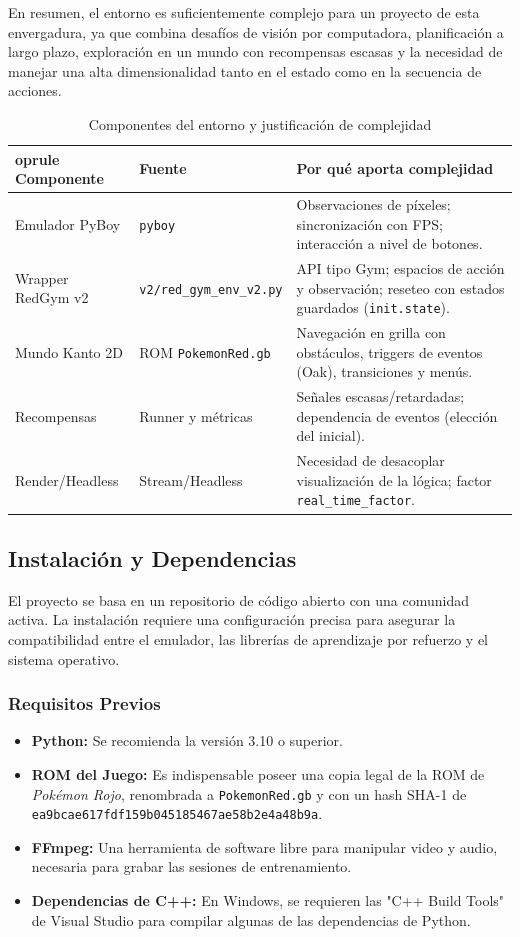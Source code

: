 \documentclass[12pt, oneside, openany]{book}
\begin{document}
En resumen, el entorno es suficientemente complejo para un proyecto de esta envergadura, ya que combina desafíos de visión por computadora, planificación a largo plazo, exploración en un mundo con recompensas escasas y la necesidad de manejar una alta dimensionalidad tanto en el estado como en la secuencia de acciones.

\begin{table}[H]
    \centering
    \caption{Componentes del entorno y justificación de complejidad}
    \label{tab:entorno_componentes}
    \begin{tabular}{@{}llp{7.5cm}@{}}
        	oprule
        Componente & Fuente & Por qué aporta complejidad \\
        \midrule
        Emulador PyBoy & \texttt{pyboy} & Observaciones de píxeles; sincronización con FPS; interacción a nivel de botones. \\
        Wrapper RedGym v2 & \texttt{v2/red\_gym\_env\_v2.py} & API tipo Gym; espacios de acción y observación; reseteo con estados guardados (\texttt{init.state}). \\
        Mundo Kanto 2D & ROM \texttt{PokemonRed.gb} & Navegación en grilla con obstáculos, triggers de eventos (Oak), transiciones y menús. \\
        Recompensas & Runner y métricas & Señales escasas/retardadas; dependencia de eventos (elección del inicial). \\
        Render/Headless & Stream/Headless & Necesidad de desacoplar visualización de la lógica; factor \texttt{real\_time\_factor}. \\
        \bottomrule
    \end{tabular}
\end{table}

\subsection{Instalación y Dependencias}
El proyecto se basa en un repositorio de código abierto con una comunidad activa. La instalación requiere una configuración precisa para asegurar la compatibilidad entre el emulador, las librerías de aprendizaje por refuerzo y el sistema operativo.

\subsubsection{Requisitos Previos}
\begin{itemize}
    \item \textbf{Python:} Se recomienda la versión 3.10 o superior.
    \item \textbf{ROM del Juego:} Es indispensable poseer una copia legal de la ROM de \textit{Pokémon Rojo}, renombrada a \texttt{PokemonRed.gb} y con un hash SHA-1 de \texttt{ea9bcae617fdf159b045185467ae58b2e4a48b9a}.
    \item \textbf{FFmpeg:} Una herramienta de software libre para manipular video y audio, necesaria para grabar las sesiones de entrenamiento.
    \item \textbf{Dependencias de C++:} En Windows, se requieren las "C++ Build Tools" de Visual Studio para compilar algunas de las dependencias de Python.
\end{itemize}
\end{document}
